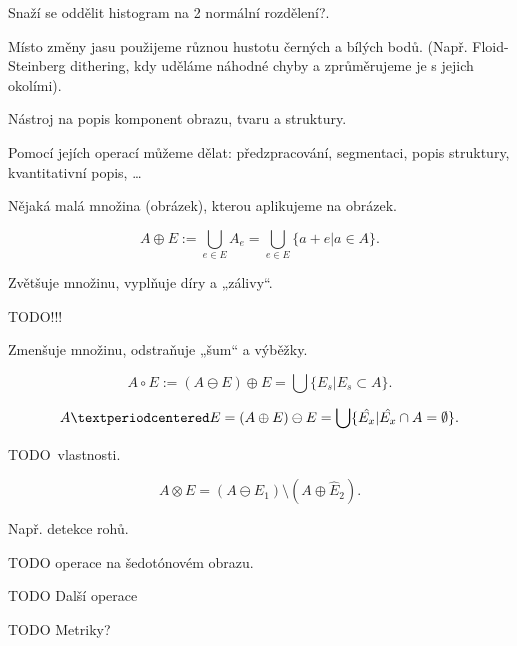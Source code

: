 \documentclass[12pt]{article}					%
\begin{document}
\begin{definice}
	Snaží se oddělit histogram na 2 normální rozdělení?.
\end{definice}

\begin{definice}[Dithering]
	Místo změny jasu použijeme různou hustotu černých a bílých bodů. (Např. Floid-Steinberg dithering, kdy uděláme náhodné chyby a zprůměrujeme je s jejich okolími).
\end{definice}


\begin{definice}
	Nástroj na popis komponent obrazu, tvaru a struktury.

	Pomocí jejích operací můžeme dělat: předzpracování, segmentaci, popis struktury, kvantitativní popis, …
\end{definice}

\begin{definice}
	Nějaká malá množina (obrázek), kterou aplikujeme na obrázek.
\end{definice}

\begin{definice}
	$$ A \oplus E := \bigcup_{e \in E} A_e = \bigcup_{e \in E} \{a + e | a \in A\}. $$

	Zvětšuje množinu, vyplňuje díry a „zálivy“.
\end{definice}

\begin{definice}[Eroze]
	TODO!!!

	Zmenšuje množinu, odstraňuje „šum“ a výběžky.
\end{definice}

\begin{definice}[Otevření]
	$$ A \circ E := (A \ominus E) \oplus E = \bigcup \{E_s| E_s \subset A\}. $$
\end{definice}

\begin{definice}[Uzavření]
	$$ A · E = (A \oplus E) \ominus E = \bigcup\{\hat{E_x} | \hat{E_x} \cap A = \O\}. $$
\end{definice}

TODO vlastnosti.

\begin{definice}
	$$ A \otimes E = (A \ominus E_1) \setminus (A \oplus \hat{E}_2). $$

	Např. detekce rohů.
\end{definice}

TODO operace na šedotónovém obrazu.


TODO Další operace

TODO Metriky?
\end{document}

